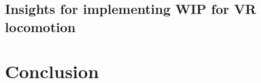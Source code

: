 \documentclass[manuscript,review,anonymous]{acmart}
\begin{document}
\subsection{Insights for implementing WIP for VR locomotion}


\section{Conclusion}






\end{document}
